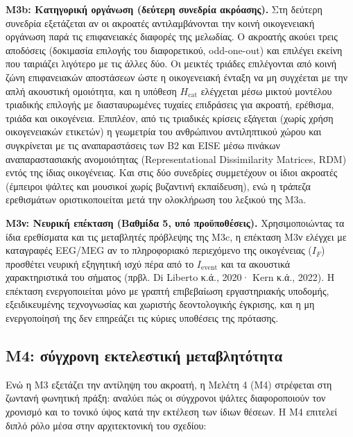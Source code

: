 \documentclass[11pt,a4paper]{article}
\begin{document}
\textbf{Μ3b: Κατηγορική οργάνωση (δεύτερη συνεδρία ακρόασης).} Στη δεύτερη συνεδρία εξετάζεται αν οι ακροατές αντιλαμβάνονται την κοινή οικογενειακή οργάνωση παρά τις επιφανειακές διαφορές της μελωδίας. Ο ακροατής ακούει τρεις αποδόσεις (δοκιμασία επιλογής του διαφορετικού, odd-one-out) και επιλέγει εκείνη που ταιριάζει λιγότερο με τις άλλες δύο. Οι μεικτές τριάδες επιλέγονται από κοινή ζώνη επιφανειακών αποστάσεων ώστε η οικογενειακή ένταξη να μη συγχέεται με την απλή ακουστική ομοιότητα, και η υπόθεση \(H_{\mathrm{cat}}\) ελέγχεται μέσω μικτού μοντέλου τριαδικής επιλογής με διασταυρωμένες τυχαίες επιδράσεις για ακροατή, ερέθισμα, τριάδα και οικογένεια. Επιπλέον, από τις τριαδικές κρίσεις εξάγεται (χωρίς χρήση οικογενειακών ετικετών) η γεωμετρία του ανθρώπινου αντιληπτικού χώρου και συγκρίνεται με τις αναπαραστάσεις των B2 και EISE μέσω πινάκων αναπαραστασιακής ανομοιότητας (Representational Dissimilarity Matrices, RDM) εντός της ίδιας οικογένειας. Και στις δύο συνεδρίες συμμετέχουν οι ίδιοι ακροατές (έμπειροι ψάλτες και μουσικοί χωρίς βυζαντινή εκπαίδευση), ενώ η τράπεζα ερεθισμάτων οριστικοποιείται μετά την ολοκλήρωση του λεξικού της Μ3a.

\textbf{Μ3ν: Νευρική επέκταση (Βαθμίδα 5, υπό προϋποθέσεις).} Χρησιμοποιώντας τα ίδια ερεθίσματα και τις μεταβλητές πρόβλεψης της Μ3c, η επέκταση Μ3ν ελέγχει με καταγραφές EEG/MEG αν το πληροφοριακό περιεχόμενο της οικογένειας (\(I_F\)) προσθέτει νευρική εξηγητική ισχύ πέρα από το \(I_{\mathrm{event}}\) και τα ακουστικά χαρακτηριστικά του σήματος (πρβλ. Di Liberto κ.ά., 2020· Kern κ.ά., 2022). Η επέκταση ενεργοποιείται μόνο με γραπτή επιβεβαίωση εργαστηριακής υποδομής, εξειδικευμένης τεχνογνωσίας και χωριστής δεοντολογικής έγκρισης, και η μη ενεργοποίησή της δεν επηρεάζει τις κύριες υποθέσεις της πρότασης.

\subsection{Μ4: σύγχρονη εκτελεστική μεταβλητότητα}\label{ux3bc4-ux3c3ux3cdux3b3ux3c7ux3c1ux3bfux3bdux3b7-ux3b5ux3baux3c4ux3b5ux3bbux3b5ux3c3ux3c4ux3b9ux3baux3ae-ux3bcux3b5ux3c4ux3b1ux3b2ux3bbux3b7ux3c4ux3ccux3c4ux3b7ux3c4ux3b1}

Ενώ η Μ3 εξετάζει την αντίληψη του ακροατή, η Μελέτη 4 (Μ4) στρέφεται στη ζωντανή φωνητική πράξη: αναλύει πώς οι σύγχρονοι ψάλτες διαφοροποιούν τον χρονισμό και το τονικό ύψος κατά την εκτέλεση των ίδιων θέσεων. Η Μ4 επιτελεί διπλό ρόλο μέσα στην αρχιτεκτονική του σχεδίου:
\end{document}
